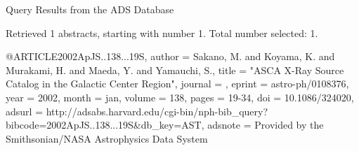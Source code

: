 Query Results from the ADS Database


Retrieved 1 abstracts, starting with number 1.  Total number selected: 1.

@ARTICLE{2002ApJS..138...19S,
   author = {{Sakano}, M. and {Koyama}, K. and {Murakami}, H. and {Maeda}, Y. and 
	{Yamauchi}, S.},
    title = "{ASCA X-Ray Source Catalog in the Galactic Center Region}",
  journal = {\apjs},
   eprint = {astro-ph/0108376},
     year = 2002,
    month = jan,
   volume = 138,
    pages = {19-34},
      doi = {10.1086/324020},
   adsurl = {http://adsabs.harvard.edu/cgi-bin/nph-bib_query?bibcode=2002ApJS..138...19S&db_key=AST},
  adsnote = {Provided by the Smithsonian/NASA Astrophysics Data System}
}


